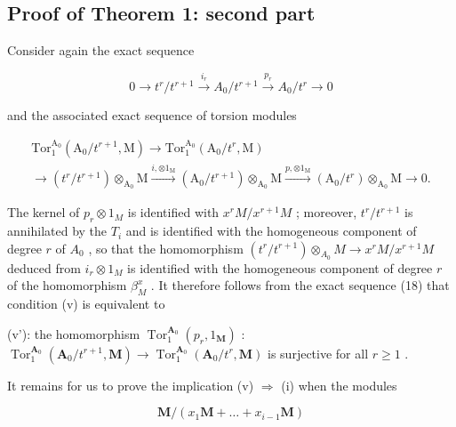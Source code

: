 \subsection{Proof of Theorem 1: second part}

Consider again the exact sequence

\[
0 \longrightarrow t ^ {r} / t ^ {r + 1} \xrightarrow {i _ {r}} A _ {0} / t ^ {r + 1} \xrightarrow {p _ {r}} A _ {0} / t ^ {r} \longrightarrow 0\tag{16}
\]

and the associated exact sequence of torsion modules

\[
\begin{array}{l} \text {Tor} _ {1} ^ {\mathrm{A} _ {0}} (\mathrm{A} _ {0} / t ^ {r + 1}, \mathrm{M}) \longrightarrow \mathrm{Tor} _ {1} ^ {\mathrm{A} _ {0}} (\mathrm{A} _ {0} / t ^ {r}, \mathrm{M}) \\ \longrightarrow (t ^ {r} / t ^ {r + 1}) \otimes_ {\mathrm{A} _ {0}} \mathrm{M} \xrightarrow {i , \otimes 1 _ {\mathrm{M}}} (\mathrm{A} _ {0} / t ^ {r + 1}) \otimes_ {\mathrm{A} _ {0}} \mathrm{M} \xrightarrow {p , \otimes 1 _ {\mathrm{M}}} (\mathrm{A} _ {0} / t ^ {r}) \otimes_ {\mathrm{A} _ {0}} \mathrm{M} \longrightarrow 0. \end{array} \tag {18}
\]

The kernel of \(p_r \otimes 1_M\) is identified with \(x^r M/x^{r+1} M\) ; moreover, \(t^r/t^{r+1}\) is annihilated by the \(T_i\) and is identified with the homogeneous component of degree \(r\) of \(A_0\) , so that the homomorphism \((t^r/t^{r+1}) \otimes_{A_0} M \to x^r M/x^{r+1} M\) deduced from \(i_r \otimes 1_M\) is identified with the homogeneous component of degree \(r\) of the homomorphism \(\beta_M^x\) . It therefore follows from the exact sequence (18) that condition (v) is equivalent to

(v'): the homomorphism \(\operatorname{Tor}_{1}^{\mathbf{A}_{0}}(p_{r},1_{\mathbf{M}})\) : \(\operatorname{Tor}_{1}^{\mathbf{A}_{0}}(\mathbf{A}_{0}/t^{r+1},\mathbf{M})\to\operatorname{Tor}_{1}^{\mathbf{A}_{0}}(\mathbf{A}_{0}/t^{r},\mathbf{M})\) is surjective for all \(r\geqslant1\) .

It remains for us to prove the implication (v) \(\Rightarrow\) (i) when the modules

\[
\mathbf {M} / (x _ {1} \mathbf {M} + \dots + x _ {i - 1} \mathbf {M})
\]

